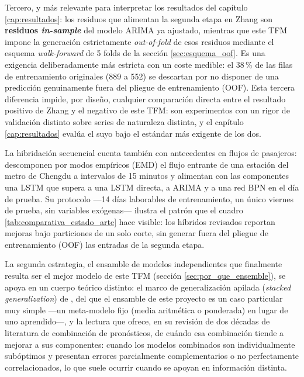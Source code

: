Tercero, y más relevante para interpretar los resultados del capítulo
\ref{cap:resultados}: los residuos que alimentan la segunda etapa en Zhang son
\textbf{residuos \emph{in-sample}} del modelo ARIMA ya ajustado, mientras que este TFM
impone la generación estrictamente \emph{out-of-fold} de esos residuos mediante el
esquema \emph{walk-forward} de 5 folds de la sección \ref{sec:esquema_oof}. Es una
exigencia deliberadamente más estricta con un coste medible: el 38\,\% de las filas de
entrenamiento originales (889 a 552) se descartan por no disponer de una predicción
genuinamente fuera del pliegue de entrenamiento (OOF). Esta tercera diferencia impide,
por diseño, cualquier comparación directa entre el resultado positivo de Zhang y el
negativo de este TFM: son experimentos con un rigor de validación distinto sobre series de
naturaleza distinta, y el capítulo \ref{cap:resultados} evalúa el suyo bajo el estándar
más exigente de los dos.

La hibridación secuencial cuenta también con antecedentes en flujos de pasajeros:
\textcite{chen2019emd} descomponen por modos empíricos (EMD) el flujo entrante de una
estación del metro de Chengdu a intervalos de 15 minutos y alimentan con las componentes
una LSTM que supera a una LSTM directa, a ARIMA y a una red BPN en el día de prueba. Su
protocolo —14 días laborables de entrenamiento, un único viernes de prueba, sin variables
exógenas— ilustra el patrón que el cuadro \ref{tab:comparativa_estado_arte} hace visible:
los híbridos revisados reportan mejoras bajo particiones de un solo corte, sin generar
fuera del pliegue de entrenamiento (OOF) las entradas de la segunda etapa.

La segunda estrategia, el ensamble de modelos independientes que finalmente resulta ser
el mejor modelo de este TFM (sección \ref{sec:por_que_ensemble}), se apoya en un cuerpo
teórico distinto: el marco de generalización apilada (\emph{stacked generalization}) de
\textcite{wolpert1992stacking}, del que el ensamble de este proyecto es un caso particular
muy simple —un meta-modelo fijo (media aritmética o ponderada) en lugar de uno
aprendido—, y la lectura que \textcite{granger1989combining} ofrece, en su revisión de
dos décadas de literatura de combinación de pronósticos, de cuándo esa combinación tiende
a mejorar a sus componentes: cuando los modelos combinados son individualmente subóptimos
y presentan errores parcialmente complementarios o no perfectamente correlacionados, lo
que suele ocurrir cuando se apoyan en información distinta.

